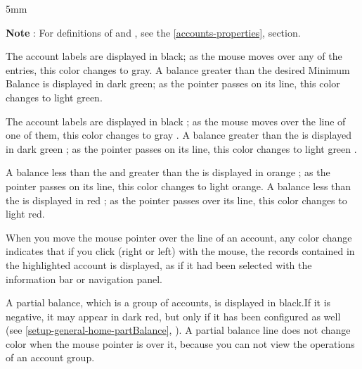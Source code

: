 
5mm

\textbf{Note} : For definitions of  and , see the \vref{accounts-properties},  section.


The account labels are displayed in black; as the mouse moves over any of the entries, this color changes to gray.
A balance greater than the desired Minimum Balance is displayed in dark green; as the pointer passes on its line, this color changes to light green.

The account labels are displayed in black{\couleur} ; as the mouse moves over the line of one of them, this color changes to gray {\couleur}.
A balance greater than the    is displayed in dark green {\couleur} ; as the pointer passes on its line, this color changes to light green {\couleur}.



A balance less than the  and greater than the  is displayed in orange{\couleur} ; as the pointer passes on its line, this color changes to light orange{\couleur}.
A balance less than the    is displayed in red{\couleur} ; as the pointer passes over its line, this color changes to light red{\couleur}.

When you move the mouse pointer over the line of an account, any color change indicates that if you click (right or left) with the mouse, the records contained in the highlighted account is displayed, as if it had been selected with the information bar or navigation panel.

A partial balance, which is a group of accounts, is displayed in black{\couleur}.If it is negative, it may appear in dark red{\couleur}, but only if it has been configured as well (see  \vref{setup-general-home-partBalance}, ). A partial balance line does not change color when the mouse pointer is over it, because you can not view the operations of an account group.




